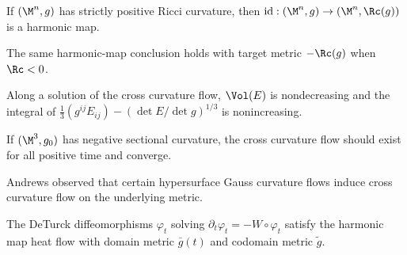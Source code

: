 \begin{corollary}
\label{ch03-cor-positive-ricci-identity-harmonic}
If \((\M^n,g)\) has strictly positive Ricci curvature, then \(\mathrm{id}:(\M^n,g)\to(\M^n,\Rc(g))\) is a harmonic map.
\end{corollary}

\begin{remark}
\label{ch03-rem-negative-ricci-target}
The same harmonic-map conclusion holds with target metric \(-\Rc(g)\) when \(\Rc<0\).
\end{remark}

\begin{proposition}
\label{ch03-prop-cross-curvature-monotonicity}
Along a solution of the cross curvature flow, \(\Vol(E)\) is nondecreasing and the integral of \(\frac13(g^{ij}E_{ij})-(\det E/\det g)^{1/3}\) is nonincreasing.
\end{proposition}

\begin{conjecture}
\label{ch03-conj-cross-curvature-global-existence}
If \((\M^3,g_0)\) has negative sectional curvature, the cross curvature flow should exist for all positive time and converge.
\end{conjecture}

\begin{remark}
\label{ch03-rem-andrews-observation}
Andrews observed that certain hypersurface Gauss curvature flows induce cross curvature flow on the underlying metric.
\end{remark}

\begin{lemma}
\label{ch03-lem-deTurck-diffeomorphisms-harmonic-map}
The DeTurck diffeomorphisms \(\varphi_t\) solving \(\partial_t\varphi_t=-W\circ\varphi_t\) satisfy the harmonic map heat flow with domain metric \(\bar g(t)\) and codomain metric \(\tilde g\).
\end{lemma}

